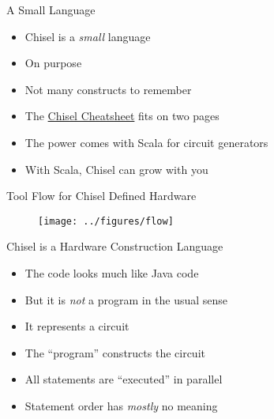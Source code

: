 \begin{frame}[fragile]{A Small Language}
\begin{itemize}
\item Chisel is a \emph{small} language
\item On purpose
\item Not many constructs to remember
\item The \href{https://github.com/freechipsproject/chisel-cheatsheet/releases/latest/download/chisel_cheatsheet.pdf}{Chisel Cheatsheet} fits on two pages
\item The power comes with Scala for circuit generators
\item With Scala, Chisel can grow with you
\end{itemize}
\end{frame}


%



\begin{frame}[fragile]{Tool Flow for Chisel Defined Hardware}
\begin{figure}
    \centering
    \texttt{[image: ../figures/flow]}
\end{figure}
\end{frame}

\begin{frame}[fragile]{Chisel is a Hardware Construction Language}
\begin{itemize}
\item The code looks much like Java code
\item But it is \emph{not} a program in the usual sense
\item It represents a circuit
\item The ``program'' constructs the circuit
\item All statements are ``executed'' in parallel
\item Statement order has \emph{mostly} no meaning
\end{itemize}
\end{frame}

